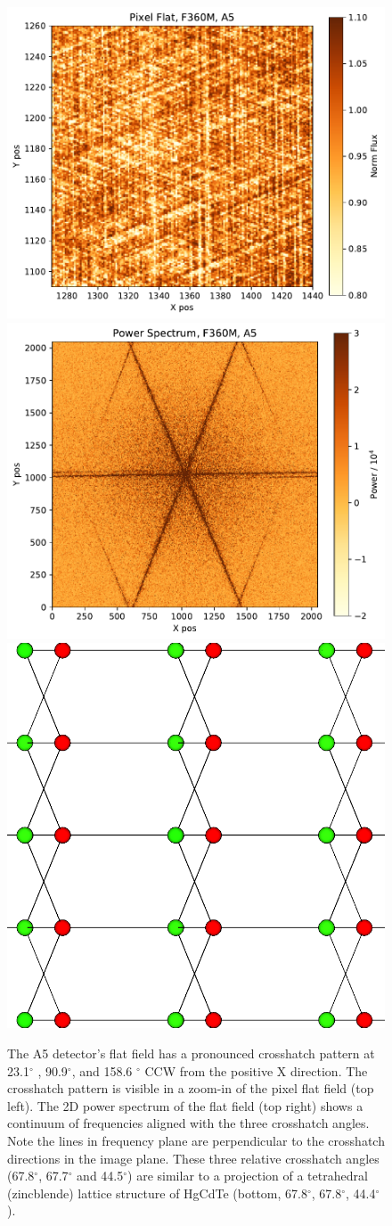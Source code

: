 \documentclass[]{aastex62}
\newcommand{\degree}{^\circ}
\begin{document}
\begin{figure}[!hbtp]
\centering
\includegraphics[width=.49\columnwidth]{crosshatch_zoom.pdf}
\includegraphics[width=.49\columnwidth]{crosshatch_2d_power.pdf}
\includegraphics[width=.3\columnwidth]{tetrahedral_lattice_projection.png}
\caption{
The A5 detector's flat field has a pronounced crosshatch pattern at 23.1$\degree$ , 90.9$\degree$, and 158.6 $\degree$ CCW from the positive X direction.
The crosshatch pattern is visible in a zoom-in of the pixel flat field (top left).
The 2D power spectrum of the flat field (top right) shows a continuum of frequencies aligned with the three crosshatch angles.
Note the lines in frequency plane are perpendicular to the crosshatch directions in the image plane.
These three relative crosshatch angles (67.8$\degree$, 67.7$\degree$ and 44.5$\degree$) are similar to a projection of a tetrahedral (zincblende) lattice structure of HgCdTe (bottom, 67.8$\degree$, 67.8$\degree$, 44.4$\degree$).
}\label{fig:crossHatchA5}
\end{figure}
\end{document}

